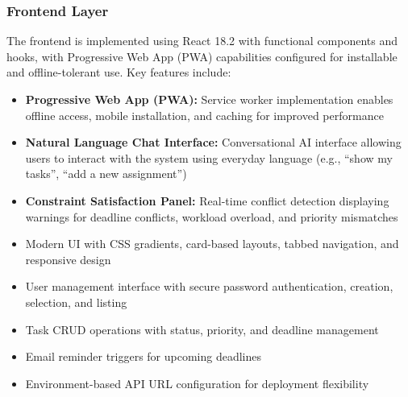 \documentclass[12pt]{article}
\begin{document}
\subsubsection{Frontend Layer}
The frontend is implemented using React 18.2 with functional components and hooks, with Progressive Web App (PWA) capabilities configured for installable and offline-tolerant use. Key features include:
\begin{itemize}
    \item \textbf{Progressive Web App (PWA):} Service worker implementation enables offline access, mobile installation, and caching for improved performance
    \item \textbf{Natural Language Chat Interface:} Conversational AI interface allowing users to interact with the system using everyday language (e.g., ``show my tasks'', ``add a new assignment'')
    \item \textbf{Constraint Satisfaction Panel:} Real-time conflict detection displaying warnings for deadline conflicts, workload overload, and priority mismatches
    \item Modern UI with CSS gradients, card-based layouts, tabbed navigation, and responsive design
    \item User management interface with secure password authentication, creation, selection, and listing
    \item Task CRUD operations with status, priority, and deadline management
    \item Email reminder triggers for upcoming deadlines
    \item Environment-based API URL configuration for deployment flexibility
\end{itemize}
\end{document}
